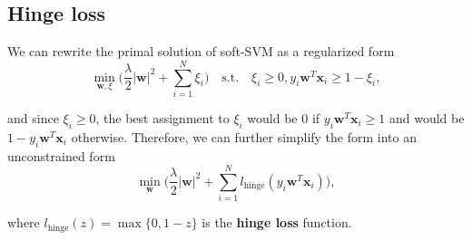 \documentclass[../main.tex]{subfiles}
\begin{document}
\subsection{Hinge loss}
We can rewrite the primal solution of soft-SVM as a regularized form $$\min_{\textbf{w}, \xi}\big( \frac{\lambda}{2}|\textbf{w}|^2+\sum_{i=1}^N\xi_i \big) \quad \text{s.t.} \quad \xi_i\geq 0, y_i\textbf{w}^T\textbf{x}_i\geq 1-\xi_i,$$ 

and since $\xi_i \geq 0$, the best assignment to $\xi_i$ would be 0 if $y_i\textbf{w}^T\textbf{x}_i\geq 1$ and would be $1-y_i\textbf{w}^T\textbf{x}_i$ otherwise. Therefore, we can further simplify the form into an unconstrained form $$\min_{\textbf{w}}\big( \frac{\lambda}{2}|\textbf{w}|^2+\sum_{i=1}^Nl_{\text{hinge}}(y_i\textbf{w}^T\textbf{x}_i) \big),$$

where $l_{\text{hinge}}(z)=\max\{0, 1-z\}$ is the \textbf{hinge loss} function.
\end{document}
